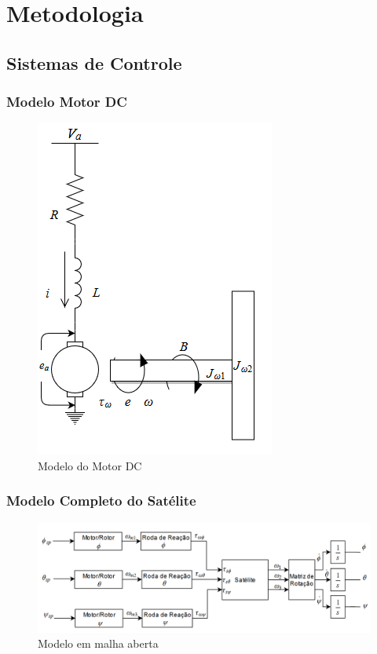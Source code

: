 \chapter{Metodologia}

\section{Sistemas de Controle}

\subsection{Modelo Motor DC}
\begin{figure}[H]
  \caption{Modelo do Motor DC}
  \begin{center}
      \includegraphics[scale=.8]{img/modelo_motor_dc}
  \end{center}
  \label{fig:modelo_motor_dc}
\end{figure}

\subsection{Modelo Completo do Satélite}

\begin{figure}[H]
  \caption{Modelo em malha aberta}
  \begin{center}
      \includegraphics[scale=.55]{img/modelo_satelite_malha_aberta}
  \end{center}
  \label{fig:modelo_satelite_malha_aberta}
\end{figure}


